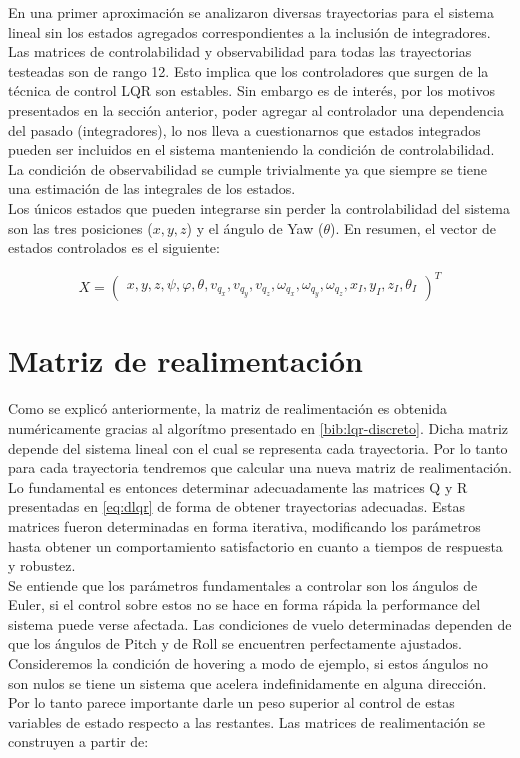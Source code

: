 \documentclass[main]{subfiles}
\begin{document}
En una primer aproximaci\'on se analizaron diversas trayectorias para el sistema lineal sin los estados agregados correspondientes a la inclusi\'on de integradores. Las matrices de controlabilidad y observabilidad para todas las trayectorias testeadas son de rango 12. Esto implica que los controladores que surgen de la t\'ecnica de control LQR son estables. Sin embargo es de inter\'es, por los motivos presentados en la secci\'on anterior, poder agregar al controlador una dependencia del pasado (integradores), lo nos lleva a cuestionarnos que estados integrados pueden ser incluidos en el sistema manteniendo la condici\'on de controlabilidad. La condici\'on de observabilidad se cumple trivialmente ya que siempre se tiene una estimaci\'on de las integrales de los estados. \\

Los \'unicos estados que pueden integrarse sin perder la controlabilidad del sistema son las tres posiciones ($x,y,z$) y el \'angulo de Yaw ($\theta$). En resumen, el vector de estados controlados es el siguiente:

\begin{equation}
\label{eq:controled}
X = \left(\begin{array}{c}
x,y,z,\psi,\varphi,\theta,v_{q_x},v_{q_y},v_{q_z},\omega_{q_x},\omega_{q_y},\omega_{q_z},x_I,y_I,z_I,\theta_I
\end{array}\right)^T
\end{equation}

\section{Matriz de realimentaci\'on}

Como se explic\'o anteriormente, la matriz de realimentaci\'on es obtenida num\'ericamente gracias al algor\'itmo presentado en \ref{bib:lqr-discreto}. Dicha matriz depende del sistema lineal con el cual se representa cada trayectoria. Por lo tanto para cada trayectoria tendremos que calcular una nueva matriz de realimentaci\'on. Lo fundamental es entonces determinar adecuadamente las matrices Q y R presentadas en \ref{eq:dlqr} de forma de obtener trayectorias adecuadas. Estas matrices fueron determinadas en forma iterativa, modificando los par\'ametros hasta obtener un comportamiento satisfactorio en cuanto a tiempos de respuesta y robustez.\\

Se entiende que los par\'ametros fundamentales a controlar son los \'angulos de Euler, si el control sobre estos no se hace en forma r\'apida la performance del sistema puede verse afectada.  Las condiciones de vuelo determinadas dependen de que los \'angulos de Pitch y de Roll se encuentren perfectamente ajustados. Consideremos la condici\'on de hovering a modo de ejemplo, si estos \'angulos no son nulos se tiene un sistema que acelera indefinidamente en alguna direcci\'on. Por lo tanto parece importante darle un peso superior al control de estas variables de estado respecto a las restantes. Las matrices de realimentaci\'on se construyen a partir de:
\end{document}
